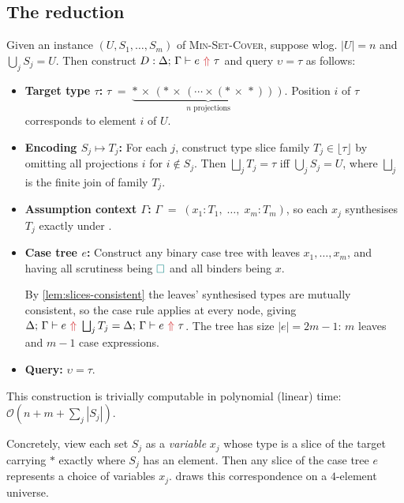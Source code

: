 \subsection{\no The reduction}\label{sec:complexity-reduction}

\begin{definition}\label{def:reduction}
Given an instance $(U, S_1, \dots, S_m)$ of \textsc{Min-Set-Cover}, suppose wlog. $|U| = n$ and $\bigcup_j S_j = U$. Then construct $D : \synthesis{e}{\tau}$ and query $\upsilon = \tau$ as follows:
\begin{itemize}
\item \textbf{Target type $\tau$:} $\tau \;=\; \underbrace{*\,\times\,(*\,\times\,(\cdots \times (*\,\times\,*)))}_{n \text{ projections}}$. Position $i$ of $\tau$ corresponds to element $i$ of $U$.
\item \textbf{Encoding $S_j \mapsto T_j$:} For each $j$, construct type slice family $T_j \in \lfloor\tau\rfloor$ by omitting all projections $i$ for $i \not\in S_j$. Then $\bigsqcup_{j} T_j = \tau$ iff $\bigcup_j S_j = U$, where $\bigsqcup_j$ is the finite join of family $T_j$.
\item \textbf{Assumption context $\Gamma$:} $\Gamma \;=\; (x_1 : T_1,\; \dots,\; x_m : T_m)$, so each $x_j$ synthesises $T_j$ exactly under .
\item \textbf{Case tree $e$:} Construct any binary case tree with leaves $x_1, \dots, x_m$, and having all scrutiness being ${\color{teal}\Box}$ and all binders being $x$.

By \cref{lem:slices-consistent} the leaves' synthesised types are mutually consistent, so the case rule applies at every node, giving $\synthesis{e}{\bigsqcup_j T_j} = \synthesis{e}{\tau}$. The tree has size $|e| = 2m - 1$: $m$ leaves and $m-1$ case expressions.
\item \textbf{Query:} $\upsilon = \tau$.
\end{itemize}
\end{definition}

\noindent This construction is trivially computable in polynomial (linear) time: $\mathcal{O}(n + m + \sum_{j}{|S_j|}).$

Concretely, view each set $S_j$ as a \textit{variable} $x_j$ whose type is a slice of the target carrying $*$ exactly where $S_j$ has an element. Then any slice of the case tree $e$ represents a choice of variables $x_j$.  draws this correspondence on a $4$-element universe.

